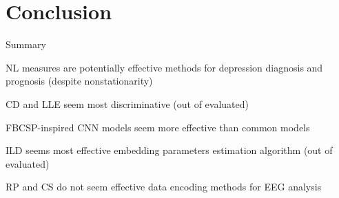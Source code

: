 \documentclass{beamer}
\begin{document}

\section{Conclusion}


\begin{frame}{Summary}
    \centering
    \begin{enumerate}
        \item NL measures are potentially effective methods for depression diagnosis and prognosis {\scriptsize(despite nonstationarity)}
        \item CD and LLE seem most discriminative {\scriptsize{(out of evaluated)}}
        \item FBCSP-inspired CNN models seem more effective than common models
        {\scriptsize
        \item ILD seems most effective embedding parameters estimation algorithm {\scriptsize(out of evaluated)}
        \item RP and CS do not seem effective data encoding methods for EEG analysis
        }
    \end{enumerate}
    
\end{frame}

\end{document}
